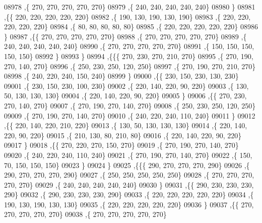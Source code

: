 \begin{DoxyCode}
08978     ,\{   270,   270,   270,   270,   270\}
08979     ,\{   240,   240,   240,   240,   240\}
08980     \}
08981    ,\{\{   220,   220,   220,   220,   220\}
08982     ,\{   190,   130,   190,   130,   190\}
08983     ,\{   220,   220,   220,   220,   220\}
08984     ,\{    80,    80,    80,    80,    80\}
08985     ,\{   220,   220,   220,   220,   220\}
08986     \}
08987    ,\{\{   270,   270,   270,   270,   270\}
08988     ,\{   270,   270,   270,   270,   270\}
08989     ,\{   240,   240,   240,   240,   240\}
08990     ,\{   270,   270,   270,   270,   270\}
08991     ,\{   150,   150,   150,   150,   150\}
08992     \}
08993    \}
08994   ,\{\{\{   270,   230,   270,   210,   270\}
08995     ,\{   270,   190,   270,   140,   270\}
08996     ,\{   250,   230,   250,   120,   250\}
08997     ,\{   270,   190,   270,   210,   270\}
08998     ,\{   240,   220,   240,   150,   240\}
08999     \}
09000    ,\{\{   230,   150,   230,   130,   230\}
09001     ,\{   230,   150,   230,   100,   230\}
09002     ,\{   220,   140,   220,    90,   220\}
09003     ,\{   130,    50,   130,   130,   130\}
09004     ,\{   220,   140,   220,    90,   220\}
09005     \}
09006    ,\{\{   270,   230,   270,   140,   270\}
09007     ,\{   270,   190,   270,   140,   270\}
09008     ,\{   250,   230,   250,   120,   250\}
09009     ,\{   270,   190,   270,   140,   270\}
09010     ,\{   240,   220,   240,   110,   240\}
09011     \}
09012    ,\{\{   220,   140,   220,   210,   220\}
09013     ,\{   130,    50,   130,   130,   130\}
09014     ,\{   220,   140,   220,    90,   220\}
09015     ,\{   210,   130,    80,   210,    80\}
09016     ,\{   220,   140,   220,    90,   220\}
09017     \}
09018    ,\{\{   270,   220,   270,   150,   270\}
09019     ,\{   270,   190,   270,   140,   270\}
09020     ,\{   240,   220,   240,   110,   240\}
09021     ,\{   270,   190,   270,   140,   270\}
09022     ,\{   150,    70,   150,   150,   150\}
09023     \}
09024    \}
09025   ,\{\{\{   290,   270,   270,   270,   290\}
09026     ,\{   290,   270,   270,   270,   290\}
09027     ,\{   250,   250,   250,   250,   250\}
09028     ,\{   270,   270,   270,   270,   270\}
09029     ,\{   240,   240,   240,   240,   240\}
09030     \}
09031    ,\{\{   290,   230,   230,   230,   290\}
09032     ,\{   290,   230,   230,   230,   290\}
09033     ,\{   220,   220,   220,   220,   220\}
09034     ,\{   190,   130,   190,   130,   130\}
09035     ,\{   220,   220,   220,   220,   220\}
09036     \}
09037    ,\{\{   270,   270,   270,   270,   270\}
09038     ,\{   270,   270,   270,   270,   270\}

\end{DoxyCode}
